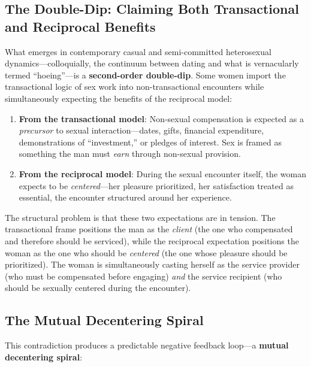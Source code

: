 \documentclass[12pt,openany]{book}
\numberwithin{equation}{chapter}
\begin{document}
\subsection{The Double-Dip: Claiming Both Transactional and Reciprocal Benefits}

What emerges in contemporary casual and semi-committed heterosexual dynamics---colloquially, the continuum between dating and what is vernacularly termed ``hoeing''---is a \textbf{second-order double-dip}. Some women import the transactional logic of sex work into non-transactional encounters while simultaneously expecting the benefits of the reciprocal model:

\begin{enumerate}
    \item \textbf{From the transactional model}: Non-sexual compensation is expected as a \textit{precursor} to sexual interaction---dates, gifts, financial expenditure, demonstrations of ``investment,'' or pledges of interest. Sex is framed as something the man must \textit{earn} through non-sexual provision.
    
    \item \textbf{From the reciprocal model}: During the sexual encounter itself, the woman expects to be \textit{centered}---her pleasure prioritized, her satisfaction treated as essential, the encounter structured around her experience.
\end{enumerate}

The structural problem is that these two expectations are in tension. The transactional frame positions the man as the \textit{client} (the one who compensated and therefore should be serviced), while the reciprocal expectation positions the woman as the one who should be \textit{centered} (the one whose pleasure should be prioritized). The woman is simultaneously casting herself as the service provider (who must be compensated before engaging) \textit{and} the service recipient (who should be sexually centered during the encounter).

\subsection{The Mutual Decentering Spiral}

This contradiction produces a predictable negative feedback loop---a \textbf{mutual decentering spiral}:
\end{document}
